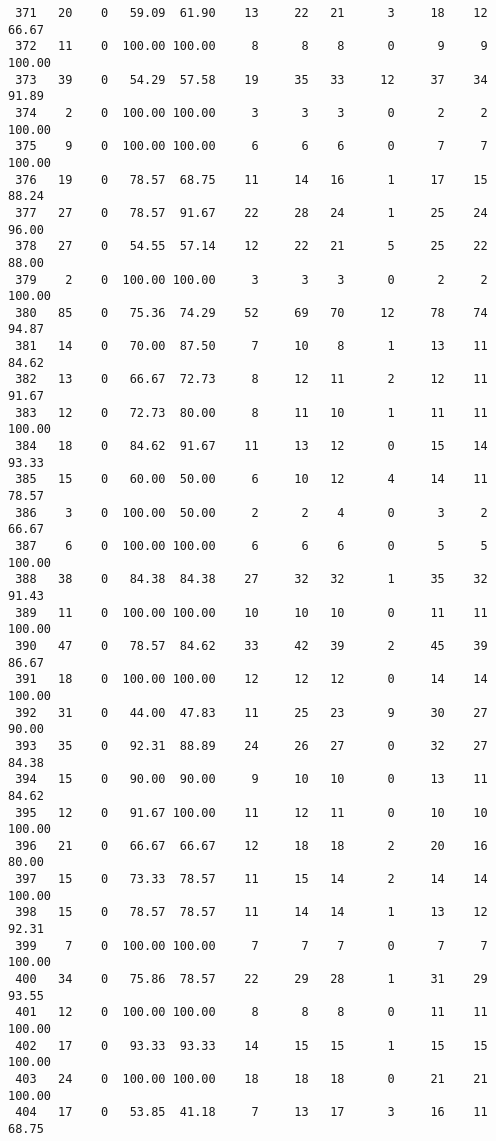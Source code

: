 \begin{verbatim}
 371   20    0   59.09  61.90    13     22   21      3     18    12    66.67
 372   11    0  100.00 100.00     8      8    8      0      9     9   100.00
 373   39    0   54.29  57.58    19     35   33     12     37    34    91.89
 374    2    0  100.00 100.00     3      3    3      0      2     2   100.00
 375    9    0  100.00 100.00     6      6    6      0      7     7   100.00
 376   19    0   78.57  68.75    11     14   16      1     17    15    88.24
 377   27    0   78.57  91.67    22     28   24      1     25    24    96.00
 378   27    0   54.55  57.14    12     22   21      5     25    22    88.00
 379    2    0  100.00 100.00     3      3    3      0      2     2   100.00
 380   85    0   75.36  74.29    52     69   70     12     78    74    94.87
 381   14    0   70.00  87.50     7     10    8      1     13    11    84.62
 382   13    0   66.67  72.73     8     12   11      2     12    11    91.67
 383   12    0   72.73  80.00     8     11   10      1     11    11   100.00
 384   18    0   84.62  91.67    11     13   12      0     15    14    93.33
 385   15    0   60.00  50.00     6     10   12      4     14    11    78.57
 386    3    0  100.00  50.00     2      2    4      0      3     2    66.67
 387    6    0  100.00 100.00     6      6    6      0      5     5   100.00
 388   38    0   84.38  84.38    27     32   32      1     35    32    91.43
 389   11    0  100.00 100.00    10     10   10      0     11    11   100.00
 390   47    0   78.57  84.62    33     42   39      2     45    39    86.67
 391   18    0  100.00 100.00    12     12   12      0     14    14   100.00
 392   31    0   44.00  47.83    11     25   23      9     30    27    90.00
 393   35    0   92.31  88.89    24     26   27      0     32    27    84.38
 394   15    0   90.00  90.00     9     10   10      0     13    11    84.62
 395   12    0   91.67 100.00    11     12   11      0     10    10   100.00
 396   21    0   66.67  66.67    12     18   18      2     20    16    80.00
 397   15    0   73.33  78.57    11     15   14      2     14    14   100.00
 398   15    0   78.57  78.57    11     14   14      1     13    12    92.31
 399    7    0  100.00 100.00     7      7    7      0      7     7   100.00
 400   34    0   75.86  78.57    22     29   28      1     31    29    93.55
 401   12    0  100.00 100.00     8      8    8      0     11    11   100.00
 402   17    0   93.33  93.33    14     15   15      1     15    15   100.00
 403   24    0  100.00 100.00    18     18   18      0     21    21   100.00
 404   17    0   53.85  41.18     7     13   17      3     16    11    68.75

\end{verbatim}
